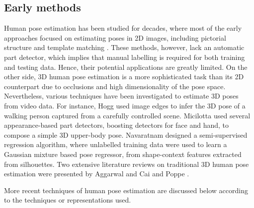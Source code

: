 \subsection{Early methods} 

Human pose estimation has been studied for decades, where most of the early approaches focused on estimating poses in 2D images, including pictorial structure \cite{Fischler1973} and template matching \cite{Ioffe1999}. These methods, however, lack an automatic part detector, which implies that manual labelling is required for both training and testing data. Hence, their potential applications are greatly limited.
On the other side, 3D human pose estimation is a more sophisticated task than its 2D counterpart due to occlusions and high dimensionality of the pose space. Nevertheless, various techniques have been investigated to estimate 3D poses from video data. For instance, Hogg \cite{Hogg1983} used image edges to infer the 3D pose of a walking person captured from a carefully controlled scene. 
Micilotta \etal \cite{Micilotta2006} used several appearance-based part detectors, \eg boosting detectors for face and hand, to compose a simple 3D upper-body pose. 
Navaratnam \etal \cite{Navaratnam2006} designed a semi-supervised regression algorithm, where unlabelled training data were used to learn a Gaussian mixture based pose regressor, from shape-context features extracted from silhouettes. Two extensive literature reviews on traditional 3D human pose estimation were presented by Aggarwal and Cai \cite{Aggarwal1999} and Poppe \cite{Poppe2007}. 

More recent techniques of human pose estimation are discussed below according to the techniques or representations used.

